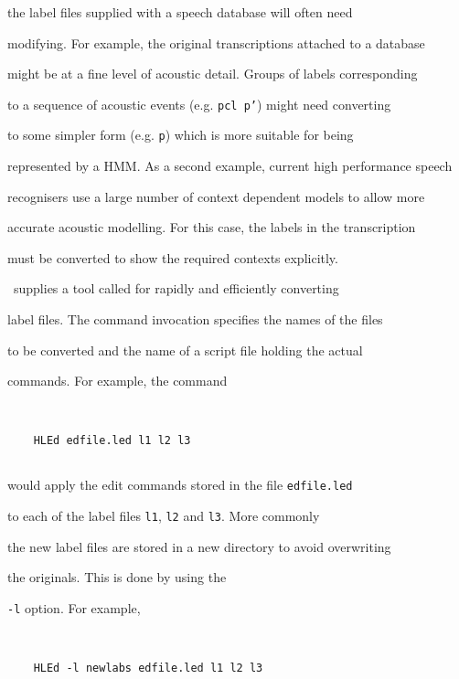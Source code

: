 the label files supplied with a speech database will often need 


modifying.  For example, the original transcriptions attached to a database


might be at a fine level of acoustic detail.  Groups of labels corresponding 


to a sequence of acoustic events (e.g. \texttt{pcl p'}) might need converting


to some simpler form (e.g. \texttt{p}) which is more suitable for being


represented by a HMM.  As a second example, current high performance speech


recognisers use a large number of context dependent models to allow more


accurate acoustic modelling.  For this case, the labels in the transcription


must be converted to show the required contexts explicitly.





\HTK\ supplies a tool called  for rapidly and efficiently converting


label files. The  command invocation specifies the names of the files


to be converted and the name of a script file holding the actual


 commands.  For example, the command


\begin{verbatim}


    HLEd edfile.led l1 l2 l3


\end{verbatim}


would apply the edit commands stored in the file \texttt{edfile.led}


to each of the label files \texttt{l1}, \texttt{l2} and \texttt{l3}. More commonly


the new label files are stored in a new directory to avoid overwriting


the originals.  This is done by using the 


\texttt{-l} option.  For example,


\begin{verbatim}


    HLEd -l newlabs edfile.led l1 l2 l3


\end{verbatim}


